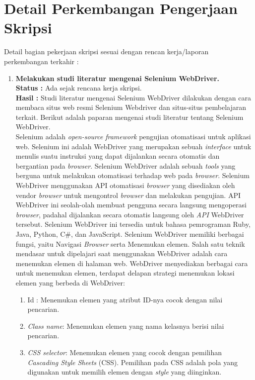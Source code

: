\documentclass[a4paper,twoside]{article}
\begin{document}
\section{Detail Perkembangan Pengerjaan Skripsi}
Detail bagian pekerjaan skripsi sesuai dengan rencan kerja/laporan perkembangan terkahir :
	\begin{enumerate}
		\item \textbf{Melakukan studi literatur mengenai Selenium WebDriver.}\\
		{\bf Status :} Ada sejak rencana kerja skripsi.\\
		{\bf Hasil :} Studi literatur mengenai Selenium WebDriver dilakukan dengan cara membaca situs web resmi Selenium Webdriver dan situs-situs pembelajaran terkait. Berikut adalah paparan mengenai studi literatur tentang Selenium WebDriver.\\
		Selenium adalah \textit{open-source} \textit{framework} pengujian otomatisasi untuk aplikasi web. Selenium ini adalah WebDriver yang merupakan sebuah \textit{interface} untuk menulis suatu instruksi yang dapat dijalankan secara otomatis dan bergantian pada \textit{browser}.  Selenium WebDriver adalah sebuah \textit{tools} yang berguna untuk melakukan otomatisasi terhadap web pada \textit{browser}. Selenium WebDriver menggunakan API otomatisasi \textit{browser} yang disediakan oleh vendor \textit{browser} untuk mengontrol \textit{browser} dan melakukan pengujian. API WebDriver ini seolah-olah membuat pengguna secara langsung mengoperasi \textit{browser}, padahal dijalankan secara otomatis langsung oleh \textit{API} WebDriver tersebut. Selenium WebDriver ini tersedia untuk bahasa pemrograman Ruby, Java, Python, C\#, dan JavaScript. Selenium WebDriver memiliki berbagai fungsi, yaitu Navigasi \textit{Browser} serta Menemukan elemen.
		Salah satu teknik mendasar untuk dipelajari saat menggunakan WebDriver adalah cara menemukan elemen di halaman web. WebDriver menyediakan berbagai cara untuk menemukan elemen, terdapat delapan strategi menemukan lokasi elemen yang berbeda di WebDriver:
		\begin{enumerate}
			\item Id : Menemukan elemen yang atribut ID-nya cocok dengan nilai pencarian.
			\item \textit{Class name}: Menemukan elemen yang nama kelasnya berisi nilai pencarian.	
			\item \textit{CSS selector}: Menemukan elemen yang cocok dengan pemilihan \textit{Cascading Style Sheets} (CSS). Pemilihan pada CSS adalah pola yang digunakan untuk memilih elemen dengan \textit{style} yang diinginkan.

\end{enumerate}
\end{enumerate}
\end{document}
